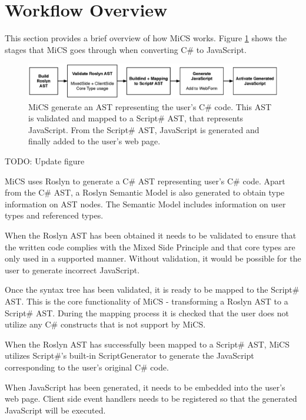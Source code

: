 \section{Workflow Overview} %
\label{sec:workflow_overview}

This section provides a brief overview of how MiCS works. Figure \ref{fig:mics_internal_workflow} shows the stages that MiCS goes through when converting C\# to JavaScript.

\begin{figure}[H]
	\begin{center}
		\centerline{\includegraphics[width=18cm]{resources/images/internalworkflow.eps}}
	\end{center}
	\caption{MiCS generate an AST representing the user's C\# code. This AST is validated and mapped to a Script\# AST, that represents JavaScript. From the Script\# AST, JavaScript is generated and finally added to the user's web page.}
	\label{fig:mics_internal_workflow}
\end{figure}

TODO: Update figure

MiCS uses Roslyn to generate a C\# AST representing user's  C\# code. Apart from the C\# AST, a Roslyn Semantic Model is also generated to obtain type information on AST nodes. The Semantic Model includes information on user types and referenced types.

When the Roslyn AST has been obtained it needs to be validated to ensure that the written code complies with the Mixed Side Principle and that core types are only used in a supported manner. Without validation, it would be possible for the user to generate incorrect JavaScript.

Once the syntax tree has been validated, it is ready to be mapped to the Script\# AST. This is the core functionality of MiCS - transforming a Roslyn AST to a Script\# AST. During the mapping process it is checked that the user does not utilize any C\# constructs that is not support by MiCS. 

When the Roslyn AST has successfully been mapped to a Script\# AST, MiCS utilizes Script\#’s built-in ScriptGenerator to generate the JavaScript corresponding to the user’s original C\# code. 

When JavaScript has been generated, it needs to be embedded into the user’s web page. Client side event handlers needs to be registered so that the generated JavaScript will be executed.


